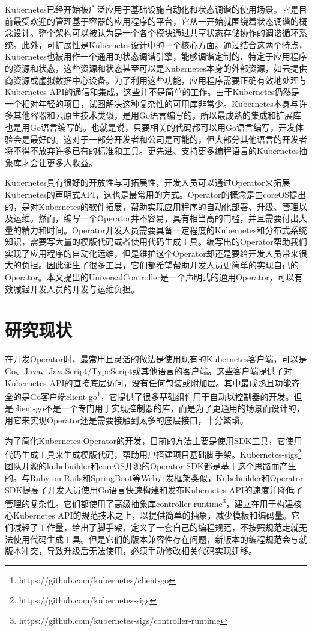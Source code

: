 \documentclass[macfonts,master]{njuthesis}
\begin{document}
Kubernetes已经开始被广泛应用于基础设施自动化和状态调谐的使用场景。它是目前最受欢迎的管理基于容器的应用程序的平台，它从一开始就围绕着状态调谐的概念设计。整个架构可以被认为是一个各个模块通过共享状态存储协作的调谐循环系统。此外，可扩展性是Kubernetes设计中的一个核心方面。通过结合这两个特点，Kubernetes也被用作一个通用的状态调谐引擎，能够调谐定制的、特定于应用程序的资源和状态，这些资源和状态甚至可以是Kubernetes本身的外部资源，如云提供商资源或虚拟数据中心设备。为了利用这些功能，应用程序需要正确有效地处理与Kubernetes API的通信和集成，这些并不是简单的工作。由于Kubernetes仍然是一个相对年轻的项目，试图解决这种复杂性的可用库非常少。Kubernetes本身与许多其他容器和云原生技术类似，是用Go语言编写的，所以最成熟的集成和扩展库也是用Go语言编写的。也就是说，只要相关的代码都可以用Go语言编写，开发体验会是最好的。这对于一部分开发者和公司是可能的，但大部分其他语言的开发者将不得不放弃许多已有的标准和工具。更先进、支持更多编程语言的Kubernetes抽象库才会让更多人收益。

Kubernetes具有很好的开放性与可拓展性，开发人员可以通过Operator来拓展Kubernetes的声明式API，这也是最常用的方式。Operator的概念是由coreOS提出的，是对Kubernetes的软件拓展，帮助实现应用程序的自动化部署、升级、管理以及运维\cite{operators}。然而，编写一个Operator并不容易，具有相当高的门槛，并且需要付出大量的精力和时间。Operator开发人员需要具备一定程度的Kubernetes和分布式系统知识，需要写大量的模版代码或者使用代码生成工具。编写出的Operator帮助我们实现了应用程序的自动化运维，但是维护这个Operator却还是要给开发人员带来很大的负担\cite{problemofoperators}。因此诞生了很多工具，它们都希望帮助开发人员更简单的实现自己的Operator。本文提出的UniversalController是一个声明式的通用Operator，可以有效减轻开发人员的开发与运维负担。

\section{研究现状}
在开发Operator时，最常用且灵活的做法是使用现有的Kubernetes客户端，可以是Go、Java、JavaScript/TypeScript或其他语言的客户端。这些客户端提供了对Kubernetes API的直接底层访问，没有任何包装或附加层。其中最成熟且功能齐全的是Go客户端client-go\footnote{https://github.com/kubernetes/client-go}，它提供了很多基础组件用于自动以控制器的开发。但是client-go不是一个专门用于实现控制器的库，而是为了更通用的场景而设计的，用它来实现Operator还是需要接触到太多的底层接口，十分繁琐。

为了简化Kubernetes Operator的开发，目前的方法主要是使用SDK工具，它使用代码生成工具来生成模版代码，帮助用户搭建项目基础脚手架。Kubernetes-sigs\footnote{https://github.com/kubernetes-sigs}团队开源的kubebuilder和coreOS开源的Operator SDK都是基于这个思路而产生的。与Ruby on Rails和SpringBoot等Web开发框架类似，Kubebuilder和Operator SDK提高了开发人员使用Go语言快速构建和发布Kubernetes API的速度并降低了管理的复杂性。它们都使用了高级抽象库controller-runtime\footnote{https://github.com/kubernetes-sigs/controller-runtime}，建立在用于构建核心Kubernetes API的规范技术之上，以提供简单的抽象，减少模板和编码量。它们减轻了工作量，给出了脚手架，定义了一套自己的编程规范，不按照规范走就无法使用代码生成工具。但是它们的版本兼容性存在问题，新版本的编程规范会与就版本冲突，导致升级后无法使用，必须手动修改相关代码实现迁移。
\end{document}
